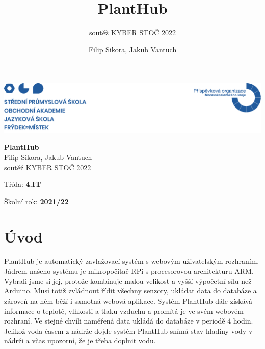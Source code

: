 \documentclass[11pt,a4paper]{article}
\title{PlantHub}
\subtitle{soutěž KYBER STOČ 2022 }
\author{Filip Sikora, Jakub Vantuch}
\date{}
\begin{document}
\begin{titlepage}
	\noindent\includegraphics[width=\linewidth]{header.png}
	\vspace{4cm} \\
	\begin{center}
		\Huge\textbf{PlantHub}
		\vspace*{1cm} \\
		\LARGE Filip Sikora, Jakub Vantuch
		\vspace*{1cm} \\
		\Large soutěž KYBER STOČ 2022
		\vfill
		\normalsize
		\begin{minipage}{0.7\linewidth}
			Třída: \textbf{4.IT}
		\end{minipage}%
		\begin{minipage}{0.25\linewidth}
			Školní rok: \textbf{2021/22}
		\end{minipage}
	\end{center}
	
\end{titlepage}


\section*{Úvod}

PlantHub je automatický zavlažovací systém s webovým uživatelským rozhraním. Jádrem našeho systému je mikropočítač RPi s procesorovou architekturu ARM. Vybrali jsme si jej, protože kombinuje malou velikost a vyšší výpočetní sílu než Arduino. Musí totiž zvládnout řídit všechny senzory, ukládat data do databáze a zároveň na něm běží i samotná webová aplikace. Systém PlantHub dále získává informace o teplotě, vlhkosti a tlaku vzduchu a promítá je ve svém webovém rozhraní. Ve stejné chvíli naměřená data ukládá do databáze v periodě 4 hodin. Jelikož voda časem z nádrže dojde systém PlantHub snímá stav hladiny vody v nádrži a včas upozorní, že je třeba doplnit vodu.
\end{document}
